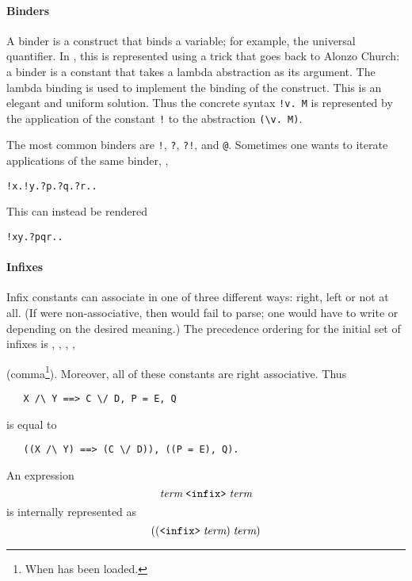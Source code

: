 \paragraph{Binders}

A binder is a construct that binds a variable; for example, the
universal quantifier. In \HOL, this is represented using a trick that
goes back to Alonzo Church: a binder is a constant that takes a lambda
abstraction as its argument. The lambda binding is used to implement
the binding of the construct. This is an elegant and uniform solution.
Thus the concrete syntax \verb+!v. M+ is represented by the
application of the constant \verb+!+ to the abstraction \verb+(\v. M)+.

The most common binders are \verb+!+, \verb+?+, \verb+?!+, and
\verb+@+. Sometimes one wants to iterate applications of the same
binder, \eg,
\begin{alltt}
   !x. !y. ?p. ?q. ?r. \term.
\end{alltt}
This can instead be rendered
\begin{alltt}
   !x y. ?p q r. \term.
\end{alltt}

\paragraph{Infixes}

Infix constants can associate in one of three different ways: right,
left or not at all.  (If \holtxt{+} were non-associative, then
 would fail to parse; one would have to write
 or  depending on the desired
meaning.)  The precedence ordering for the initial set of infixes is
\holtxt{/\bs}, \holtxt{\bs/}, \holtxt{==>}, \holtxt{=},
\begin{Large}\holtxt{,}\end{Large} (comma\footnote{When
   has been loaded.}). Moreover, all of these
constants are right associative. Thus
\begin{hol}
\begin{verbatim}
   X /\ Y ==> C \/ D, P = E, Q
\end{verbatim}
\end{hol}
%
is equal to
%
\begin{hol}
\begin{verbatim}
   ((X /\ Y) ==> (C \/ D)), ((P = E), Q).
\end{verbatim}
\end{hol}
%
\noindent An expression
\[
\term \; \holtxt{<infix>}\; \term
\]
is internally represented as
\[
((\holtxt{<infix>}\; \term)\; \term)
\]

